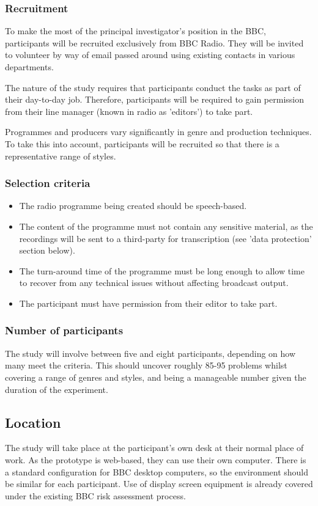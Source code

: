 \subsubsection{Recruitment}
To make the most of the principal investigator's position in the BBC,
participants will be recruited exclusively from BBC Radio. They will be invited
to volunteer by way of email passed around using existing contacts in various
departments. 

The nature of the study requires that participants conduct the tasks as part of
their day-to-day job. Therefore, participants will be required to gain
permission from their line manager (known in radio as 'editors') to take part.

Programmes and producers vary significantly in genre and production techniques.
To take this into account, participants will be recruited so that there is a
representative range of styles.

\subsubsection{Selection criteria}
\begin{itemize}
\item The radio programme being created should be speech-based.
\item The content of the programme must not contain any sensitive material, as
the recordings will be sent to a third-party for transcription (see 'data
protection' section below).
\item The turn-around time of the programme must be long enough to allow time
to recover from any technical issues without affecting broadcast output.
\item The participant must have permission from their editor to take part.
\end{itemize}

\subsubsection{Number of participants}
The study will involve between five and eight participants, depending on how
many meet the criteria. This should uncover roughly 85-95%
problems \citep{Nielsen1993} whilst covering a range of genres and styles, and
being a manageable number given the duration of the experiment.

\subsection{Location}
The study will take place at the participant's own desk at their normal place
of work. As the prototype is web-based, they can use their own computer. There
is a standard configuration for BBC desktop computers, so the environment
should be similar for each participant. Use of display screen equipment is
already covered under the existing BBC risk assessment process.

